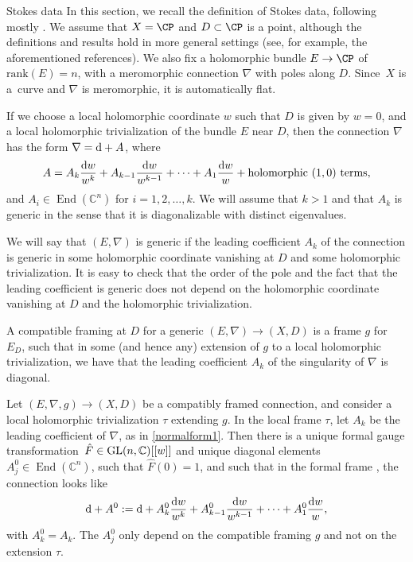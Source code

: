 \begin{subsubsection}{Stokes data}\label{GMD}
In this section, we recall the definition of Stokes data, following mostly \cite{Bir, B, B2, Wasow,Wit}. We assume that $X=\CP$ and $D\subset \CP$ is a point, although the definitions and results hold in more general settings (see, for example, the aforementioned references). We also fix a holomorphic bundle $E\to \CP$ of $\text{rank}(E)=n$, with a meromorphic connection $\nabla$ with poles along $D$. Since~$X$ is a~curve and $\nabla$ is meromorphic, it is automatically flat.

If we choose a local holomorphic coordinate $w$ such that $D$ is given by $w=0$, and a local holomorphic trivialization of the bundle $E$ near $D$, then the connection $\nabla$ has the form $\nabla={\rm d}+A$, where
\begin{equation} \label{normalform1}
 A=A_k\frac{{\rm d}w}{w^k}+A_{k-1}\frac{{\rm d}w}{w^{k-1}}+ \dots +A_1\frac{{\rm d}w}{w} + \text{holomorphic $(1,0)$ terms},
\end{equation}
and $A_i\in \operatorname{End}(\mathbb{C}^{n})$ for $i=1,2,\dots ,k$. We will assume that $k>1$ and that $A_k$ is generic in the sense that it is diagonalizable with distinct eigenvalues.

We will say that $(E,\nabla)$ is generic if the leading coefficient $A_k$ of the connection is generic in some holomorphic coordinate vanishing at $D$ and some holomorphic trivialization. It is easy to check that the order of the pole and the fact that the leading coefficient is generic does not depend on the holomorphic coordinate vanishing at $D$ and the holomorphic trivialization.

\begin{Definition}
A compatible framing at $D$ for a generic $(E,\nabla)\to (X,D)$ is a frame $g$ for~$E_{D}$, such that in some (and hence any) extension of $g$ to a local holomorphic trivialization, we have that the leading coefficient $A_k$ of the singularity of $\nabla$ is diagonal.
\end{Definition}

\begin{Lemma}[{\cite[Lemma 1]{B2}}] \label{FGT}
Let $(E,\nabla,g)\to (X,D)$ be a compatibly framed connection, and consider a local holomorphic trivialization $\tau$ extending $g$. In the local frame $\tau$, let $A_k$ be the leading coefficient of $\nabla$, as in \eqref{normalform1}. Then there is a unique formal gauge transformation~${\hat{F}\in {\rm GL}(n,\mathbb{C})[[w]]}$ and unique diagonal elements $A^0_j\in \operatorname{End}(\mathbb{C}^n)$, such that $\hat{F}(0)=1$, and such that in the formal frame , the connection looks like
\begin{equation*}
 {\rm d}+A^0:={\rm d}+A_{k}^0\frac{{\rm d}w}{w^k}+A_{k-1}^0\frac{{\rm d}w}{w^{k-1}}+ \dots +A_1^0\frac{{\rm d}w}{w},
\end{equation*}
with $A_k^0=A_k$. The $A^0_j$ only depend on the compatible framing $g$ and not on the extension $\tau$.
\end{Lemma}


\end{subsubsection}
